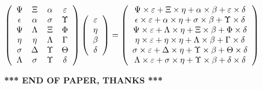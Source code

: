 \documentclass[12pt]{article}
\begin{document}
$  %
 \left( \begin{array}
 {
 c
 c
 c
 c
 }
 \Psi & 
                    \Xi & 
 \alpha & 
 \varepsilon \\ 
 \epsilon & 
 \alpha & 
 \sigma & 
 \Upsilon \\ 
 \Psi & 
 \Lambda & 
                    \Xi & 
 \Phi \\ 
 \eta & 
 \eta & 
 \Lambda & 
 \Gamma \\ 
 \sigma & 
 \Delta & 
 \Upsilon & 
 \Theta \\ 
 \Lambda & 
 \sigma & 
 \Upsilon & 
 \delta
 \end{array} \right)
 \left( \begin{array}
 {
 c
 }
 \varepsilon \\ 
 \eta \\ 
 \beta \\ 
 \delta
 \end{array} \right)
=
 \left( \begin{array}
 {
 c
 }
  \Psi \times  \varepsilon +                     \Xi \times  \eta +  \alpha \times  \beta +  \varepsilon \times  \delta \\ 
  \epsilon \times  \varepsilon +  \alpha \times  \eta +  \sigma \times  \beta +  \Upsilon \times  \delta \\ 
  \Psi \times  \varepsilon +  \Lambda \times  \eta +                     \Xi \times  \beta +  \Phi \times  \delta \\ 
  \eta \times  \varepsilon +  \eta \times  \eta +  \Lambda \times  \beta +  \Gamma \times  \delta \\ 
  \sigma \times  \varepsilon +  \Delta \times  \eta +  \Upsilon \times  \beta +  \Theta \times  \delta \\ 
  \Lambda \times  \varepsilon +  \sigma \times  \eta +  \Upsilon \times  \beta +  \delta \times  \delta
 \end{array} \right)
$
 
 
 
 
 
\noindent{}

 
 
   
   
 \vspace{0.2in}
 
   
   
   
   
\vspace{1.0in} 
{\textbf{\large{ *** END OF PAPER, THANKS *** }}} 
   
\end{document}
